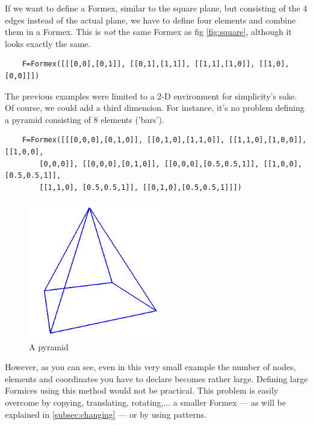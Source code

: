 If we want to define a Formex, similar to the square plane, but consisting of the 4 edges instead of the actual plane, we have to define four elements and combine them in a Formex. This is \emph{not} the same Formex as fig \ref{fig:square}, although it looks exactly the same.
\begin{verbatim}
	F=Formex([[[0,0],[0,1]], [[0,1],[1,1]], [[1,1],[1,0]], [[1,0],[0,0]]])
\end{verbatim}

The previous examples were limited to a 2-D environment for simplicity's sake. Of course, we could add a third dimension. For instance, it's no problem defining a pyramid consisting of 8 elements ('bars').
\begin{verbatim}
	F=Formex([[[0,0,0],[0,1,0]], [[0,1,0],[1,1,0]], [[1,1,0],[1,0,0]], [[1,0,0], 
		[0,0,0]], [[0,0,0],[0,1,0]], [[0,0,0],[0.5,0.5,1]], [[1,0,0],[0.5,0.5,1]], 
		[[1,1,0], [0.5,0.5,1]], [[0,1,0],[0.5,0.5,1]]])
\end{verbatim}

\begin{figure}[ht]
  \centering
  \begin{makeimage}
  \end{makeimage}
  \begin{latexonly}
    \includegraphics[width=6cm]{images/pyramide}
  \end{latexonly}
  \begin{htmlonly}
  \end{htmlonly}  
  \caption{A pyramid}
  \label{fig:pyramid}
\end{figure}

However, as you can see, even in this very small example the number of nodes, elements and coordinates you have to declare becomes rather large. Defining large Formices using this method would not be practical. This problem is easily overcome by copying, translating, rotating,... a smaller Formex --- as will be explained in \ref{subsec:changing} --- or by using patterns.
 
